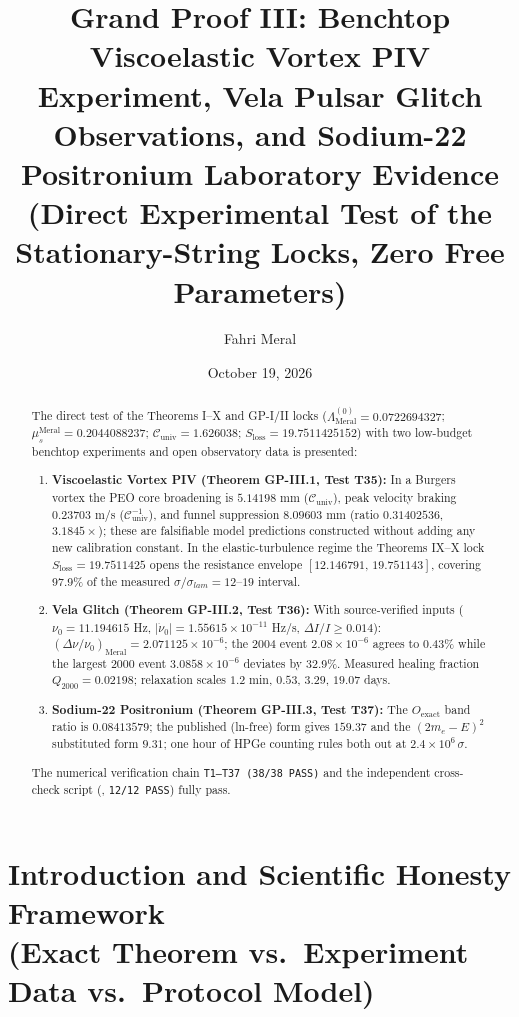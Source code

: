 \documentclass[12pt,a4paper]{article}
\title{\textbf{Grand Proof III: Benchtop Viscoelastic Vortex PIV Experiment, Vela Pulsar Glitch Observations, and Sodium-22 Positronium Laboratory Evidence} \\[0.3cm]
\large (Direct Experimental Test of the Stationary-String Locks, Zero Free Parameters)}
\author{Fahri Meral}
\date{October 19, 2026}
\begin{document}
\maketitle

\begin{abstract}
The direct test of the Theorems I--X and GP-I/II locks
($\Lambda_{\mathrm{Meral}}^{(0)}=0.0722694327$;
$\mu_s^{\mathrm{Meral}}=0.2044088237$; $\mathcal{C}_{\mathrm{univ}}=1.626038$;
$S_{\mathrm{loss}}=19.7511425152$) with two low-budget benchtop experiments
and open observatory data is presented:
\begin{enumerate}
    \item \textbf{Viscoelastic Vortex PIV (Theorem GP-III.1, Test T35):}
    In a Burgers vortex the PEO core broadening is $5.14198$ mm
    ($\mathcal{C}_{\mathrm{univ}}$), peak velocity braking $0.23703$ m/s
    ($\mathcal{C}_{\mathrm{univ}}^{-1}$), and funnel suppression $8.09603$ mm
    (ratio $0.31402536$, $3.1845\times$); these are falsifiable model
    predictions constructed without adding any new calibration constant.
    In the elastic-turbulence regime the Theorems IX--X lock
    $S_{\mathrm{loss}}=19.7511425$ opens the resistance envelope
    $[12.146791,\,19.751143]$, covering 97.9\% of the measured
    $\sigma/\sigma_{lam}=12$--$19$ interval.
    \item \textbf{Vela Glitch (Theorem GP-III.2, Test T36):}
    With source-verified inputs ($\nu_0=11.194615$ Hz,
    $|\dot\nu_0|=1.55615\times10^{-11}$ Hz/s, $\Delta I/I\ge 0.014$):
    $(\Delta\nu/\nu_0)_{\mathrm{Meral}}=2.071125\times 10^{-6}$; the 2004
    event $2.08\times10^{-6}$ agrees to 0.43\% while the largest 2000 event
    $3.0858\times10^{-6}$ deviates by 32.9\%. Measured healing fraction
    $Q_{2000}=0.02198$; relaxation scales $1.2$ min, $0.53$, $3.29$, $19.07$ days.
    \item \textbf{Sodium-22 Positronium (Theorem GP-III.3, Test T37):}
    The $O_{\mathrm{exact}}$ band ratio is $0.08413579$; the published
    (ln-free) form gives $159.37$ and the $(2m_e-E)^2$ substituted form
    $9.31$; one hour of HPGe counting rules both out at $2.4\times 10^6\,\sigma$.
\end{enumerate}
The numerical verification chain \texttt{T1--T37 (38/38 PASS)} and the
independent cross-check script (, \texttt{12/12 PASS})
fully pass.
\end{abstract}

\section{Introduction and Scientific Honesty Framework \\ (Exact Theorem vs.\ Experiment Data vs.\ Protocol Model)}
\end{document}
